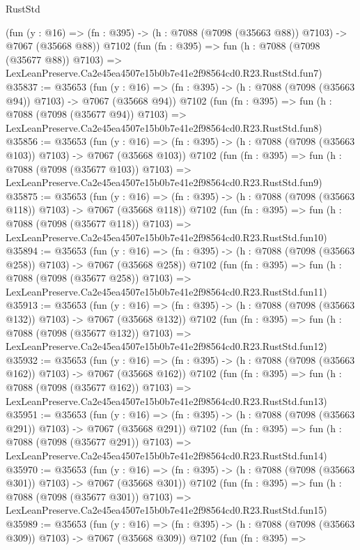 \begin{lexlean}{RustStd}
\begin{coremodule}
    (fun (y : @16) => (fn : @395) -> (h : @7088 (@7098 (@35663 @88)) @7103) -> @7067 (@35668 @88))
    @7102
    (fun (fn : @395) =>
    fun (h : @7088 (@7098 (@35677 @88)) @7103) =>
    LexLeanPreserve.Ca2e45ea4507e15b0b7e41e2f98564cd0.R23.RustStd.fun7)
@35837 := @35653
    (fun (y : @16) => (fn : @395) -> (h : @7088 (@7098 (@35663 @94)) @7103) -> @7067 (@35668 @94))
    @7102
    (fun (fn : @395) =>
    fun (h : @7088 (@7098 (@35677 @94)) @7103) =>
    LexLeanPreserve.Ca2e45ea4507e15b0b7e41e2f98564cd0.R23.RustStd.fun8)
@35856 := @35653
    (fun (y : @16) => (fn : @395) -> (h : @7088 (@7098 (@35663 @103)) @7103) -> @7067 (@35668 @103))
    @7102
    (fun (fn : @395) =>
    fun (h : @7088 (@7098 (@35677 @103)) @7103) =>
    LexLeanPreserve.Ca2e45ea4507e15b0b7e41e2f98564cd0.R23.RustStd.fun9)
@35875 := @35653
    (fun (y : @16) => (fn : @395) -> (h : @7088 (@7098 (@35663 @118)) @7103) -> @7067 (@35668 @118))
    @7102
    (fun (fn : @395) =>
    fun (h : @7088 (@7098 (@35677 @118)) @7103) =>
    LexLeanPreserve.Ca2e45ea4507e15b0b7e41e2f98564cd0.R23.RustStd.fun10)
@35894 := @35653
    (fun (y : @16) => (fn : @395) -> (h : @7088 (@7098 (@35663 @258)) @7103) -> @7067 (@35668 @258))
    @7102
    (fun (fn : @395) =>
    fun (h : @7088 (@7098 (@35677 @258)) @7103) =>
    LexLeanPreserve.Ca2e45ea4507e15b0b7e41e2f98564cd0.R23.RustStd.fun11)
@35913 := @35653
    (fun (y : @16) => (fn : @395) -> (h : @7088 (@7098 (@35663 @132)) @7103) -> @7067 (@35668 @132))
    @7102
    (fun (fn : @395) =>
    fun (h : @7088 (@7098 (@35677 @132)) @7103) =>
    LexLeanPreserve.Ca2e45ea4507e15b0b7e41e2f98564cd0.R23.RustStd.fun12)
@35932 := @35653
    (fun (y : @16) => (fn : @395) -> (h : @7088 (@7098 (@35663 @162)) @7103) -> @7067 (@35668 @162))
    @7102
    (fun (fn : @395) =>
    fun (h : @7088 (@7098 (@35677 @162)) @7103) =>
    LexLeanPreserve.Ca2e45ea4507e15b0b7e41e2f98564cd0.R23.RustStd.fun13)
@35951 := @35653
    (fun (y : @16) => (fn : @395) -> (h : @7088 (@7098 (@35663 @291)) @7103) -> @7067 (@35668 @291))
    @7102
    (fun (fn : @395) =>
    fun (h : @7088 (@7098 (@35677 @291)) @7103) =>
    LexLeanPreserve.Ca2e45ea4507e15b0b7e41e2f98564cd0.R23.RustStd.fun14)
@35970 := @35653
    (fun (y : @16) => (fn : @395) -> (h : @7088 (@7098 (@35663 @301)) @7103) -> @7067 (@35668 @301))
    @7102
    (fun (fn : @395) =>
    fun (h : @7088 (@7098 (@35677 @301)) @7103) =>
    LexLeanPreserve.Ca2e45ea4507e15b0b7e41e2f98564cd0.R23.RustStd.fun15)
@35989 := @35653
    (fun (y : @16) => (fn : @395) -> (h : @7088 (@7098 (@35663 @309)) @7103) -> @7067 (@35668 @309))
    @7102
    (fun (fn : @395) =>

\end{coremodule}
\end{lexlean}
